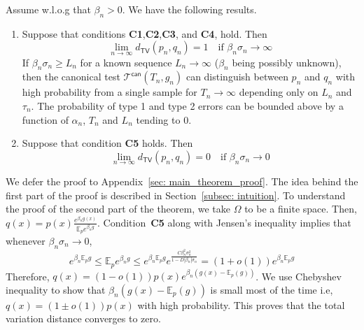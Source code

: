 \documentclass[final,12pt]{colt2018}
\begin{document}
\begin{theorem}
\label{main_theorem} Assume w.l.o.g that $\beta_n >0$. We have the following results.
\begin{enumerate}
\item
Suppose that conditions \textbf{C1},\textbf{C2},\textbf{C3}, and \textbf{C4}, hold. Then
\begin{equation}
\lim_{n\to \infty }d_{\mathsf{TV}}(p_n,q_n) = 1 \quad \text{if  $\beta_n \sigma_n \to \infty$}
\end{equation}
If $\beta_n\sigma_n \geq L_n$ for a known sequence $L_n \to \infty$ ($\beta_n$ being possibly unknown), then the canonical test $\mathcal{T}^{\mathsf{can}}(T_n,g_n)$ can distinguish between $p_n$ and $q_n$ with high probability from a single sample for $T_n \to \infty$ depending only on $L_n $ and $\tau_n$. The probability of type 1 and type 2 errors can be bounded above by a function of $\alpha_n$, $T_n$ and $L_n$ tending to $0$.

\item
Suppose that condition \textbf{C5} holds. Then
\begin{equation}
\lim_{n\to \infty }d_{\mathsf{TV}}(p_n,q_n) = 0 \quad \text{if  $\beta_n \sigma_n \to 0$}
\end{equation}
\end{enumerate}

\end{theorem}

We defer the proof to Appendix~\ref{sec: main_theorem_proof}. The idea behind the first part of the proof is described in Section~\ref{subsec: intuition}. To understand the proof of the second part of the theorem, we take $\Omega$ to be a finite space. Then, $q(x) = p(x)\frac{e^{\beta_n g(x)}}{\mathbb{E}_p e^{\beta_n g}}$. Condition~\textbf{C5} along with Jensen's inequality implies that whenever $\beta_n\sigma_n \to 0$, 
$$e^{\beta_n \mathbb{E}_p g}\leq \mathbb{E}_p e^{\beta_n g} \leq e^{\beta_n \mathbb{E}_p g}e^{\frac{C\beta_n^2\sigma_n^2}{1-D|\beta_n|\sigma_n}} = (1+o(1))e^{\beta_n \mathbb{E}_p g}$$
Therefore, $q(x) = (1- o(1))p(x)e^{\beta_n(g(x) -\mathbb{E}_p(g))}$. We use Chebyshev inequality to show that $\beta_n (g(x) - \mathbb{E}_p(g))$ is small most of the time i.e,  $q(x) = (1\pm o(1))p(x)$ with high probability. This proves that the total variation distance converges to zero.
\end{document}
